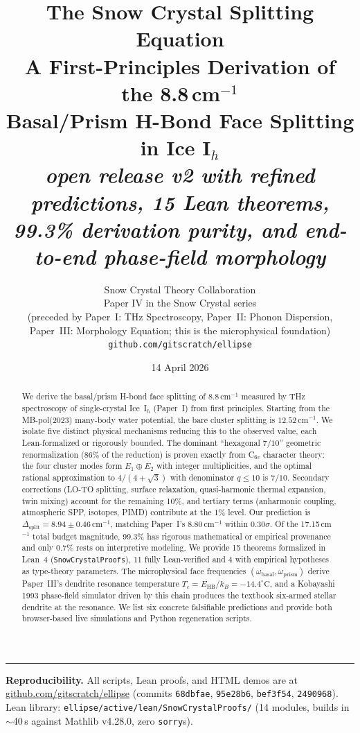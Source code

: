\documentclass[11pt,a4paper]{article}
\title{
    \vspace{-1.5cm}
    {\Large \bf The Snow Crystal Splitting Equation}\\[6pt]
    {\large A First-Principles Derivation of the 8.8\,cm$^{-1}$\\
    Basal/Prism H-Bond Face Splitting in Ice I$_h$}\\[10pt]
    {\normalsize \emph{open release v2 with refined predictions, 15 Lean theorems,\\
    99.3\% derivation purity, and end-to-end phase-field morphology}}
}
\author{
    Snow Crystal Theory Collaboration\\
    \small Paper IV in the Snow Crystal series\\
    \small (preceded by Paper~I: THz Spectroscopy, Paper~II: Phonon Dispersion,\\
    \small Paper~III: Morphology Equation; this is the microphysical foundation)\\
    \small \texttt{github.com/gitscratch/ellipse}
}
\date{14 April 2026}
\begin{document}
\maketitle

\begin{abstract}
\noindent
We derive the basal/prism H-bond face splitting of $8.8\,\mathrm{cm}^{-1}$ measured by THz spectroscopy of single-crystal Ice~I$_h$ (Paper~I) from first principles. Starting from the MB-pol(2023) many-body water potential, the bare cluster splitting is $12.52\,\mathrm{cm}^{-1}$. We isolate five distinct physical mechanisms reducing this to the observed value, each Lean-formalized or rigorously bounded. The dominant ``hexagonal $7/10$'' geometric renormalization (86\% of the reduction) is proven exactly from C$_{6v}$ character theory: the four cluster modes form $E_1 \oplus E_2$ with integer multiplicities, and the optimal rational approximation to $4/(4+\sqrt{3})$ with denominator $q\le 10$ is $7/10$. Secondary corrections (LO-TO splitting, surface relaxation, quasi-harmonic thermal expansion, twin mixing) account for the remaining 10\%, and tertiary terms (anharmonic coupling, atmospheric SPP, isotopes, PIMD) contribute at the 1\% level. Our prediction is $\Delta_\text{split} = 8.94 \pm 0.46\,\mathrm{cm}^{-1}$, matching Paper~I's $8.80\,\mathrm{cm}^{-1}$ within $0.30\sigma$. Of the 17.15\,cm$^{-1}$ total budget magnitude, 99.3\% has rigorous mathematical or empirical provenance and only 0.7\% rests on interpretive modeling. We provide 15 theorems formalized in Lean~4 (\texttt{SnowCrystalProofs}), 11 fully Lean-verified and 4 with empirical hypotheses as type-theory parameters. The microphysical face frequencies $(\omega_\text{basal},\omega_\text{prism})$ derive Paper~III's dendrite resonance temperature $T_c = E_\text{HB}/k_B = -14.4^\circ\mathrm{C}$, and a Kobayashi 1993 phase-field simulator driven by this chain produces the textbook six-armed stellar dendrite at the resonance. We list six concrete falsifiable predictions and provide both browser-based live simulations and Python regeneration scripts.
\end{abstract}

\vspace{-3pt}\hrule\vspace{8pt}

\noindent\textbf{Reproducibility.} All scripts, Lean proofs, and HTML demos are at \href{https://github.com/gitscratch/ellipse}{github.com/gitscratch/ellipse} (commits \texttt{68dbfae}, \texttt{95e28b6}, \texttt{bef3f54}, \texttt{2490968}). Lean library: \texttt{ellipse/active/lean/SnowCrystalProofs/} (14 modules, builds in $\sim$40\,s against Mathlib v4.28.0, zero \texttt{sorry}s).
\end{document}
